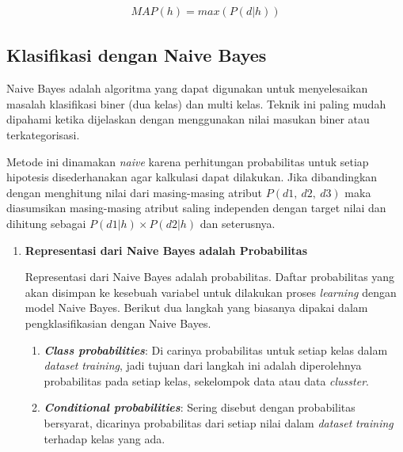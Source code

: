 \begin{subs}
	\begin{equation}\label{eq: nbayes4}
	\begin{split}
	MAP(h) = max(P(d|h))
	\end{split}
	\end{equation}
		
	\subsection{Klasifikasi dengan Naive Bayes}
	\label{sec:sub_sec2_class_bayes}
	\vspace{1ex}
	
	Naive Bayes adalah algoritma yang dapat digunakan untuk menyelesaikan masalah klasifikasi biner (dua kelas) dan multi kelas. Teknik ini paling mudah dipahami ketika dijelaskan dengan menggunakan nilai masukan biner atau terkategorisasi.
	\vspace{1ex}
	
	Metode ini dinamakan \textit{naive} karena perhitungan probabilitas untuk setiap hipotesis disederhanakan agar kalkulasi dapat dilakukan. Jika dibandingkan dengan menghitung nilai dari masing-masing atribut $P(d1,\ d2,\ d3)$ maka  diasumsikan masing-masing atribut saling independen dengan target nilai dan dihitung sebagai $P(d1|h) \times P(d2|h)$ dan seterusnya.
	\vspace{1ex}
	
	\begin{enumerate}[label=\textbf{\arabic*).}]
		
		\item \textbf{Representasi dari Naive Bayes adalah Probabilitas}
		\setlength{\parindent}{0.8cm}
	
		Representasi dari Naive Bayes adalah probabilitas. Daftar probabilitas yang akan disimpan ke kesebuah variabel untuk dilakukan proses \textit{learning} dengan model Naive Bayes. Berikut dua langkah yang biasanya dipakai dalam pengklasifikasian dengan Naive Bayes.
		
		\begin{enumerate}[label=\textbf{\alph*.}]
			\item \textbf{\textit{Class probabilities}}: Di carinya probabilitas untuk setiap kelas dalam \textit{dataset} \textit{training}, jadi tujuan dari langkah ini adalah diperolehnya probabilitas pada setiap kelas, sekelompok data atau data \textit{clusster}.
			\item \textbf{\textit{Conditional probabilities}}: Sering disebut dengan probabilitas bersyarat, dicarinya probabilitas dari setiap nilai dalam \textit{dataset} \textit{training} terhadap kelas yang ada.
		\end{enumerate}
	

\end{enumerate}
\end{subs}
